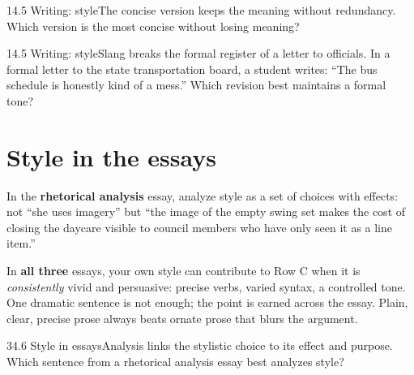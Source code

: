 \documentclass[11pt]{article}
\begin{document}
\begin{q}{1}{4.5 Writing: style}{The concise version keeps the meaning without redundancy.}
Which version is the most concise without losing meaning?
\end{q}

\begin{q}{1}{4.5 Writing: style}{Slang breaks the formal register of a letter to officials.}
In a formal letter to the state transportation board, a student writes: ``The bus schedule is honestly kind of a mess.'' Which revision best maintains a formal tone?
\end{q}

\section{Style in the essays}

In the \textbf{rhetorical analysis} essay, analyze style as a set of choices with effects: not ``she uses imagery'' but ``the image of the empty swing set makes the cost of closing the daycare visible to council members who have only seen it as a line item.''

In \textbf{all three} essays, your own style can contribute to Row C when it is \emph{consistently} vivid and persuasive: precise verbs, varied syntax, a controlled tone. One dramatic sentence is not enough; the point is earned across the essay. Plain, clear, precise prose always beats ornate prose that blurs the argument.

\begin{q}{3}{4.6 Style in essays}{Analysis links the stylistic choice to its effect and purpose.}
Which sentence from a rhetorical analysis essay best analyzes style?
\end{q}

\makekey
\end{document}
